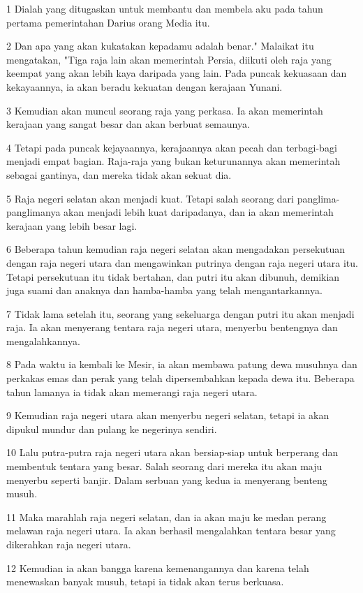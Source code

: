 \par 1 Dialah yang ditugaskan untuk membantu dan membela aku pada tahun pertama pemerintahan Darius orang Media itu.
\par 2 Dan apa yang akan kukatakan kepadamu adalah benar." Malaikat itu mengatakan, "Tiga raja lain akan memerintah Persia, diikuti oleh raja yang keempat yang akan lebih kaya daripada yang lain. Pada puncak kekuasaan dan kekayaannya, ia akan beradu kekuatan dengan kerajaan Yunani.
\par 3 Kemudian akan muncul seorang raja yang perkasa. Ia akan memerintah kerajaan yang sangat besar dan akan berbuat semaunya.
\par 4 Tetapi pada puncak kejayaannya, kerajaannya akan pecah dan terbagi-bagi menjadi empat bagian. Raja-raja yang bukan keturunannya akan memerintah sebagai gantinya, dan mereka tidak akan sekuat dia.
\par 5 Raja negeri selatan akan menjadi kuat. Tetapi salah seorang dari panglima-panglimanya akan menjadi lebih kuat daripadanya, dan ia akan memerintah kerajaan yang lebih besar lagi.
\par 6 Beberapa tahun kemudian raja negeri selatan akan mengadakan persekutuan dengan raja negeri utara dan mengawinkan putrinya dengan raja negeri utara itu. Tetapi persekutuan itu tidak bertahan, dan putri itu akan dibunuh, demikian juga suami dan anaknya dan hamba-hamba yang telah mengantarkannya.
\par 7 Tidak lama setelah itu, seorang yang sekeluarga dengan putri itu akan menjadi raja. Ia akan menyerang tentara raja negeri utara, menyerbu bentengnya dan mengalahkannya.
\par 8 Pada waktu ia kembali ke Mesir, ia akan membawa patung dewa musuhnya dan perkakas emas dan perak yang telah dipersembahkan kepada dewa itu. Beberapa tahun lamanya ia tidak akan memerangi raja negeri utara.
\par 9 Kemudian raja negeri utara akan menyerbu negeri selatan, tetapi ia akan dipukul mundur dan pulang ke negerinya sendiri.
\par 10 Lalu putra-putra raja negeri utara akan bersiap-siap untuk berperang dan membentuk tentara yang besar. Salah seorang dari mereka itu akan maju menyerbu seperti banjir. Dalam serbuan yang kedua ia menyerang benteng musuh.
\par 11 Maka marahlah raja negeri selatan, dan ia akan maju ke medan perang melawan raja negeri utara. Ia akan berhasil mengalahkan tentara besar yang dikerahkan raja negeri utara.
\par 12 Kemudian ia akan bangga karena kemenangannya dan karena telah menewaskan banyak musuh, tetapi ia tidak akan terus berkuasa.

